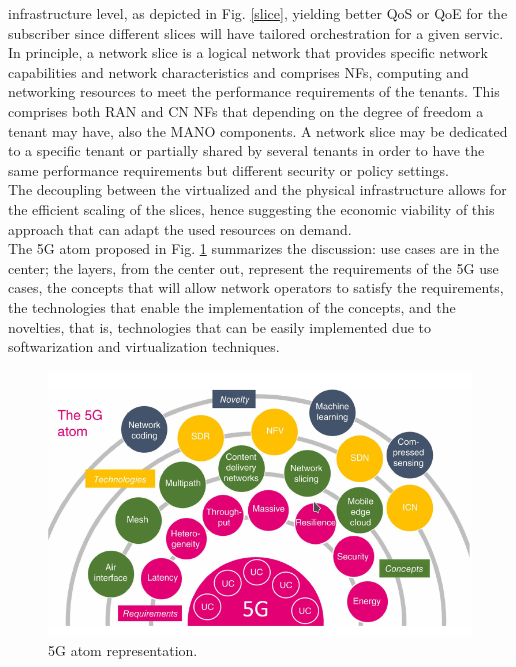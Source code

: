 \documentclass[a4paper,12pt]{report} %
\begin{document}
infrastructure level, as depicted in Fig. \ref{slice}, yielding better \gls{QoS} or \gls{QoE} for the subscriber since different slices will have tailored orchestration for a given
servic.\\
In principle, a network slice is a logical network that provides specific network capabilities and
network characteristics and comprises NFs, computing and networking resources to meet the
­performance requirements of the tenants. This comprises both \gls{RAN} and CN NFs that depending on the degree of freedom a tenant may have, also
the MANO components. A network slice may be dedicated to a
specific tenant or partially shared by several tenants in order to have the same performance requirements
but different security or policy settings. \\
The decoupling between the virtualized and the physical
infrastructure allows for the efficient scaling of the slices, hence suggesting the
economic viability of this approach that can adapt the used resources on demand.\\
The 5G atom proposed in Fig. \ref{atom} summarizes the discussion: use cases are in the center; the layers, from the center out, represent the requirements of the 5G use cases, the concepts that will allow network
operators to satisfy the requirements, the technologies that enable the implementation of
the concepts, and the novelties, that is, technologies that can be easily implemented due
to softwarization and virtualization techniques.
\begin{figure}[h]
\centering
\includegraphics[scale=0.63]{pics/5g_atom.png} 
\caption{5G atom representation. \cite{marsch20185g}}
\label{atom}
\end{figure}
\end{document}
